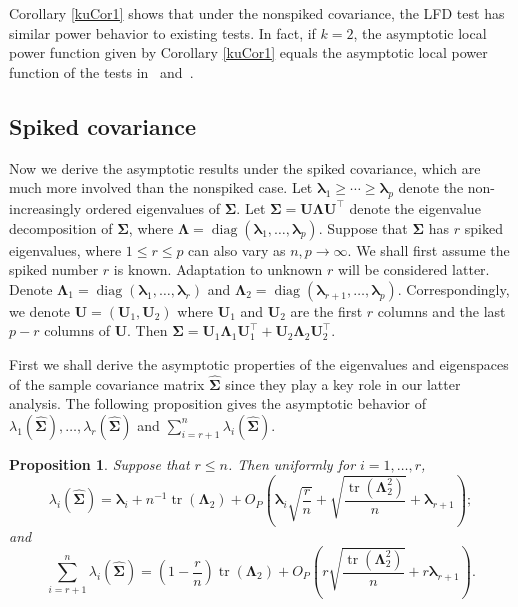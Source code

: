 \documentclass[12pt]{article} %
\DeclareMathOperator{\mytr}{tr}
\DeclareMathOperator{\mydiag}{diag}
\newcommand{\bZ}{\mathbf{Z}}
\newcommand{\bU}{\mathbf{U}}
\newcommand{\bfsym}[1]{\ensuremath{\boldsymbol{#1}}}
\def\blambda {\bfsym {\lambda}}
\def\bLambda {\bfsym {\Lambda}}
\def\bSigma {\bfsym {\Sigma}}
\newtheorem{proposition}{Proposition}
\theoremstyle{definition}
\begin{document}
Corollary \ref{kuCor1} shows that under the nonspiked covariance, the LFD test has similar power behavior to existing tests.
In fact, if $k=2$, the asymptotic local power function given by Corollary \ref{kuCor1} equals the asymptotic local power function of the tests in~\citet{Bai1996Efiect} and~\citet{Chen2010A}.




\subsection{Spiked covariance}


Now we derive the asymptotic results under the spiked covariance, which are much more involved than the nonspiked case.
Let $\blambda_1\geq\cdots \geq \blambda_p$ denote the non-increasingly ordered eigenvalues of $\bSigma$.
Let $\bSigma= \bU\bLambda \bU^\top$ denote the eigenvalue decomposition of $\bSigma$, where $\bLambda =\mydiag (\blambda_1,\ldots,\blambda_p)$.
Suppose that $\bSigma$ has $r$ spiked eigenvalues, where $1\leq r\leq p$ can also vary as $n,p\to \infty$.
    We shall first assume the spiked number $r$ is known.
    Adaptation to unknown $r$ will be considered latter.
Denote $\bLambda_1=\mydiag(\blambda_1,\ldots,\blambda_r)$ and $\bLambda_2=\mydiag(\blambda_{r+1},\ldots,\blambda_p)$.
Correspondingly, we denote $\bU=(\bU_1,\bU_2)$ where $\bU_1$ and $\bU_2$ are the first $r$ columns and the last $p-r$ columns of $\bU$.
Then $\bSigma=\bU_1\bLambda_1 \bU_1^\top+\bU_2\bLambda_2 \bU_2^\top$.




First we shall derive the asymptotic properties of the eigenvalues and eigenspaces of the sample covariance matrix $\hat{\bSigma}$ since they play a key role in our latter analysis.
    The following proposition gives the asymptotic behavior of $\lambda_1(\hat{\bSigma}),\ldots, \lambda_r(\hat{\bSigma})$ and $\sum_{i=r+1}^n\lambda_i(\hat{\bSigma})$.
\begin{proposition}
    \label{eigenvalueProp}
    Suppose that $r\leq n$.
    Then uniformly for $i=1,\ldots, r$, 
\begin{equation*}
    \lambda_i(\hat{\bSigma})
        =
        \blambda_i
        +
        n^{-1}\mytr(\bLambda_2)
        +O_P\left(\blambda_i \sqrt{\frac{r}{n}}+\sqrt{\frac{\mytr(\bLambda_2^2)}{ n}}+\blambda_{r+1}\right);
    \end{equation*}
        and
\begin{equation*}
     \sum_{i=r+1}^n\lambda_i(\hat{\bSigma})
    =
    \left(1-\frac{r}{n}\right)\mytr(\bLambda_2)
    +O_P\left(r\sqrt{\frac{\mytr(\bLambda_2^2)}{ n}}+r\blambda_{r+1}\right)
    .
\end{equation*}
\end{proposition}
\end{document}
